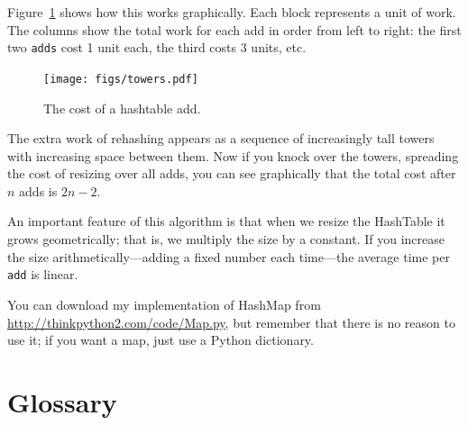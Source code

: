 \documentclass[10pt]{book}
\begin{document}
Figure~\ref{fig.hash} shows how this works graphically.  Each
block represents a unit of work.  The columns show the total
work for each add in order from left to right: the first two
{\tt adds} cost 1 unit each, the third costs 3 units, etc.

\begin{figure}
\centerline{\texttt{[image: figs/towers.pdf]}}
\caption{The cost of a hashtable add.\label{fig.hash}}
\end{figure}

The extra work of rehashing appears as a sequence of increasingly
tall towers with increasing space between them.  Now if you knock
over the towers, spreading the cost of resizing over all
adds, you can see graphically that the total cost after $n$
adds is $2n - 2$.

An important feature of this algorithm is that when we resize the
HashTable it grows geometrically; that is, we multiply the size by a
constant.  If you increase the size
arithmetically---adding a fixed number each time---the average time
per {\tt add} is linear.

You can download my implementation of HashMap from
\url{http://thinkpython2.com/code/Map.py}, but remember that there
is no reason to use it; if you want a map, just use a Python dictionary.

\section{Glossary}
\end{document}
